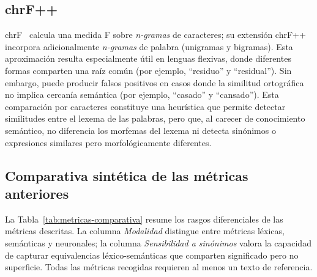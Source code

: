 \subsection{chrF++}

chrF~\cite{Popovic2015} calcula una medida F sobre \textit{n-gramas} de
caracteres; su extensión chrF++~\cite{Popovic2017} incorpora adicionalmente
\textit{n-gramas} de palabra (unigramas y bigramas). Esta aproximación resulta
especialmente útil en lenguas flexivas, donde diferentes formas comparten una
raíz común (por ejemplo, ``residuo'' y ``residual''). Sin embargo, puede
producir falsos positivos en casos donde la similitud ortográfica no implica
cercanía semántica (por ejemplo, ``casado'' y ``cansado''). Esta comparación
por caracteres constituye una heurística que permite detectar similitudes entre
el lexema de las palabras, pero que, al carecer de conocimiento semántico, no
diferencia los morfemas del lexema ni detecta sinónimos o expresiones similares
pero morfológicamente diferentes.

\subsection{Comparativa sintética de las métricas anteriores}

La Tabla~\ref{tab:metricas-comparativa} resume los rasgos diferenciales de las
métricas descritas. La columna \emph{Modalidad} distingue entre métricas
léxicas, semánticas y neuronales; la columna
\emph{Sensibilidad a sinónimos} valora la capacidad de capturar equivalencias
léxico-semánticas que comparten significado pero no superficie. Todas las
métricas recogidas requieren al menos un texto de referencia.

